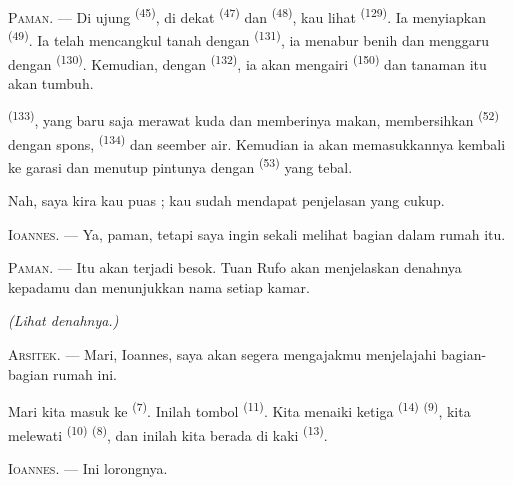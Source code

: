 \VUsaut{3.0mm}

\textsc{Paman}. --- Di ujung  \textsuperscript{(45)},
di dekat  \textsuperscript{(47)} dan
 \textsuperscript{(48)}, kau lihat  \textsuperscript{(129)}. Ia menyiapkan 
\textsuperscript{(49)}. Ia telah mencangkul tanah dengan
 \textsuperscript{(131)}, ia menabur benih dan
menggaru dengan  \textsuperscript{(130)}. Kemudian,
dengan  \textsuperscript{(132)}, ia akan mengairi
 \textsuperscript{(150)} dan tanaman itu akan
tumbuh.

 \textsuperscript{(133)}, yang baru saja merawat
kuda dan memberinya makan, membersihkan 
\textsuperscript{(52)} dengan spons, 
\textsuperscript{(134)} dan seember air. Kemudian ia akan
memasukkannya kembali ke garasi dan menutup pintunya dengan
 \textsuperscript{(53)} yang tebal.

Nah, saya kira kau puas ; kau sudah mendapat penjelasan yang cukup.

\textsc{Ioannes}. --- Ya, paman, tetapi saya ingin sekali melihat
bagian dalam rumah itu.

\textsc{Paman}. --- Itu akan terjadi besok. Tuan Rufo akan
menjelaskan denahnya kepadamu dan menunjukkan nama setiap kamar.

\VUsaut{3.0mm}
\VUsaut{2.4mm}

{\centering\textit{(Lihat denahnya.)}\par}
\VUsaut{2.4mm}

\textsc{Arsitek}. --- Mari, Ioannes, saya akan segera mengajakmu
menjelajahi bagian-bagian rumah ini.

Mari kita masuk ke  \textsuperscript{(7)}. Inilah
tombol  \textsuperscript{(11)}. Kita menaiki ketiga
 \textsuperscript{(14)} 
\textsuperscript{(9)}, kita melewati 
\textsuperscript{(10)}  \textsuperscript{(8)}, dan
inilah kita berada di kaki  \textsuperscript{(13)}.

\textsc{Ioannes}. --- Ini lorongnya.


